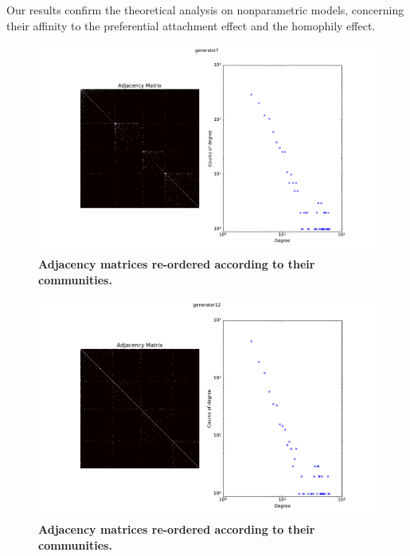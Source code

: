 Our results confirm the theoretical analysis on nonparametric models, concerning their affinity to the preferential attachment effect and the homophily effect.

\begin{figure}[h]
	\centering
	\includegraphics[scale=0.25]{img/Graph7}
	\caption{\textbf{Adjacency matrices re-ordered according to their communities.}}
	\label{fig:}
\end{figure}
\begin{figure}[h]
	\centering
	\includegraphics[scale=0.25]{img/Graph12}
	\caption{\textbf{Adjacency matrices re-ordered according to their communities.}}
	\label{fig:}
\end{figure}
